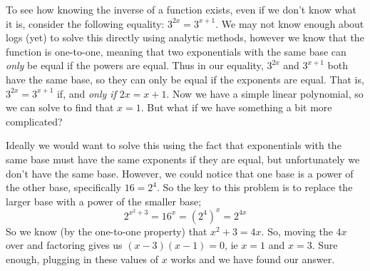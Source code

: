 \documentclass{ximeraXloud}
\begin{document}
    
    To see how knowing the inverse of a function exists, even if we don't know what it is, consider the following equality: $3^{2x} = 3^{x+1}$. We may not know enough about logs (yet) to solve this directly using analytic methods, however we know that the function is one-to-one, meaning that two exponentials with the same base can \textit{only} be equal if the powers are equal. Thus in our equality, $3^{2x}$ and $3^{x+1}$ both have the same base, so they can only be equal if the exponents are equal. That is, $3^{2x} = 3^{x+1}$ if, and \textit{only if} $2x = x+1$. Now we have a simple linear polynomial, so we can solve to find that $x = 1$. But what if we have something a bit more complicated?
    
    \begin{explanation}[Determine all $x$ values that satisfy $2^{x^2 + 3} = 16^{x}$]%
        Ideally we would want to solve this using the fact that exponentials with the same base must have the same exponents if they are equal, but unfortunately we don't have the same base. However, we could notice that one base is a power of the other base, specifically $16 = 2^4$. So the key to this problem is to replace the larger base with a power of the smaller base;
        \[
            2^{x^2 + 3} = 16^x = \left(2^4\right)^x = 2^{4x}
        \]
        So we know (by the one-to-one property) that $x^2 + 3 = 4x$. So, moving the $4x$ over and factoring gives us $(x-3)(x-1) = 0$, ie $x = 1$ and $x = 3$. Sure enough, plugging in these values of $x$ works and we have found our answer.
    \end{explanation}%

\end{document}
